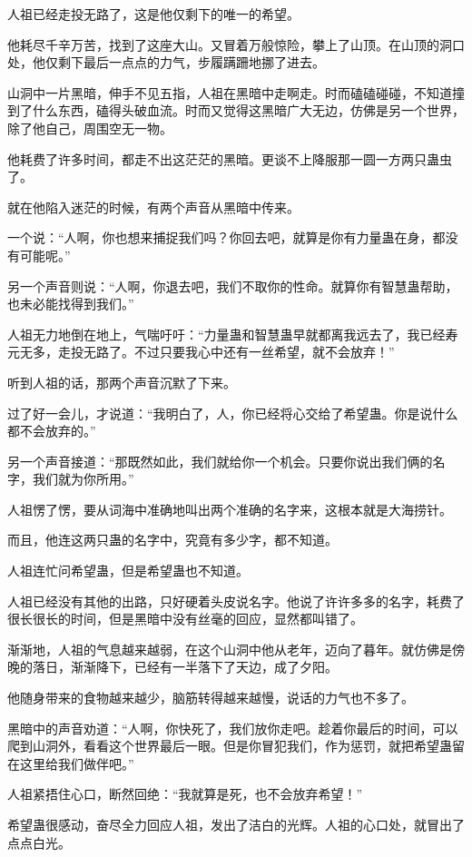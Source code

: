 \begin{this_body}
人祖已经走投无路了，这是他仅剩下的唯一的希望。

他耗尽千辛万苦，找到了这座大山。又冒着万般惊险，攀上了山顶。在山顶的洞口处，他仅剩下最后一点点的力气，步履蹒跚地挪了进去。

山洞中一片黑暗，伸手不见五指，人祖在黑暗中走啊走。时而磕磕碰碰，不知道撞到了什么东西，磕得头破血流。时而又觉得这黑暗广大无边，仿佛是另一个世界，除了他自己，周围空无一物。

他耗费了许多时间，都走不出这茫茫的黑暗。更谈不上降服那一圆一方两只蛊虫了。

就在他陷入迷茫的时候，有两个声音从黑暗中传来。

一个说：“人啊，你也想来捕捉我们吗？你回去吧，就算是你有力量蛊在身，都没有可能呢。”

另一个声音则说：“人啊，你退去吧，我们不取你的性命。就算你有智慧蛊帮助，也未必能找得到我们。”

人祖无力地倒在地上，气喘吁吁：“力量蛊和智慧蛊早就都离我远去了，我已经寿元无多，走投无路了。不过只要我心中还有一丝希望，就不会放弃！”

听到人祖的话，那两个声音沉默了下来。

过了好一会儿，才说道：“我明白了，人，你已经将心交给了希望蛊。你是说什么都不会放弃的。”

另一个声音接道：“那既然如此，我们就给你一个机会。只要你说出我们俩的名字，我们就为你所用。”

人祖愣了愣，要从词海中准确地叫出两个准确的名字来，这根本就是大海捞针。

而且，他连这两只蛊的名字中，究竟有多少字，都不知道。

人祖连忙问希望蛊，但是希望蛊也不知道。

人祖已经没有其他的出路，只好硬着头皮说名字。他说了许许多多的名字，耗费了很长很长的时间，但是黑暗中没有丝毫的回应，显然都叫错了。

渐渐地，人祖的气息越来越弱，在这个山洞中他从老年，迈向了暮年。就仿佛是傍晚的落日，渐渐降下，已经有一半落下了天边，成了夕阳。

他随身带来的食物越来越少，脑筋转得越来越慢，说话的力气也不多了。

黑暗中的声音劝道：“人啊，你快死了，我们放你走吧。趁着你最后的时间，可以爬到山洞外，看看这个世界最后一眼。但是你冒犯我们，作为惩罚，就把希望蛊留在这里给我们做伴吧。”

人祖紧捂住心口，断然回绝：“我就算是死，也不会放弃希望！”

希望蛊很感动，奋尽全力回应人祖，发出了洁白的光辉。人祖的心口处，就冒出了点点白光。


\end{this_body}
